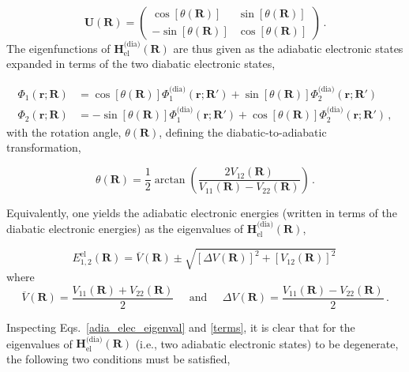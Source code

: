 \documentclass[9pt,bestpractices,pubversion]{livecoms}
\newcommand{\R}{\mathbf{R}}
\newcommand{\Rprime}{\mathbf{R'}}
\newcommand{\re}{\mathbf{r}}
\begin{document}
\begin{equation}
\label{uni_trans_mat}
    \mathbf{U}(\R) = 
    \begin{pmatrix}
        \cos[\theta(\R)] & \sin[\theta(\R)] \\
        -\sin[\theta(\R)] & \cos[\theta(\R)]
    \end{pmatrix} \, .
\end{equation}
The eigenfunctions of $\mathbf{H}_{\text{el}}^{\text{(dia)}}(\R)$ are thus given as the adiabatic electronic states expanded in terms of the two diabatic electronic states, 

\begin{equation}
\label{adia_elec_eigenvec}
\begin{split}
    \Phi_1(\re;\R) &= \cos[\theta(\R)] \Phi_1^{\text{(dia)}}(\re; \Rprime) + \sin[\theta(\R)] \Phi_2^{\text{(dia)}}(\re; \Rprime)\\
    \Phi_2(\re;\R) &= -\sin[\theta(\R)] \Phi_1^{\text{(dia)}}(\re; \Rprime) + \cos[\theta(\R)] \Phi_2^{\text{(dia)}}(\re; \Rprime) \, ,
\end{split}
\end{equation}
with the rotation angle, $\theta(\R)$, defining the diabatic-to-adiabatic transformation,

\begin{equation}
\label{mix_ang}
    \theta(\R) = \frac{1}{2} \arctan \left(\frac{2V_{12}(\R)}{V_{11}(\R) - V_{22}(\R)}\right) \, .
\end{equation}

Equivalently, one yields the adiabatic electronic energies (written in terms of the diabatic electronic energies) as the eigenvalues of $\mathbf{H}_{\text{el}}^{\text{(dia)}}(\R)$,\cite{atchity_potential_1991, domcke_conical_2004}

\begin{equation}
\label{adia_elec_eigenval}
    E_{1,2}^{\text{el}}(\R) = \overline{V}(\R) \pm \sqrt{\left[\Delta V(\R)\right]^2 + \left[V_{12}(\R)\right]^2} \,
\end{equation}
where
\begin{equation}
\label{terms}
    \overline{V}(\R) = \frac{V_{11}(\R) + V_{22}(\R)}{2} \;\;\;\;\; \text{and} \;\;\;\;\; \Delta V(\R) = \frac{V_{11}(\R) - V_{22}(\R)}{2} \, .
\end{equation}

Inspecting Eqs.~\eqref{adia_elec_eigenval} and \eqref{terms}, it is clear that for the eigenvalues of $\mathbf{H}_{\text{el}}^{\text{(dia)}}(\R)$ (i.e., two adiabatic electronic states) to be degenerate, the following two conditions must be satisfied,
\end{document}
